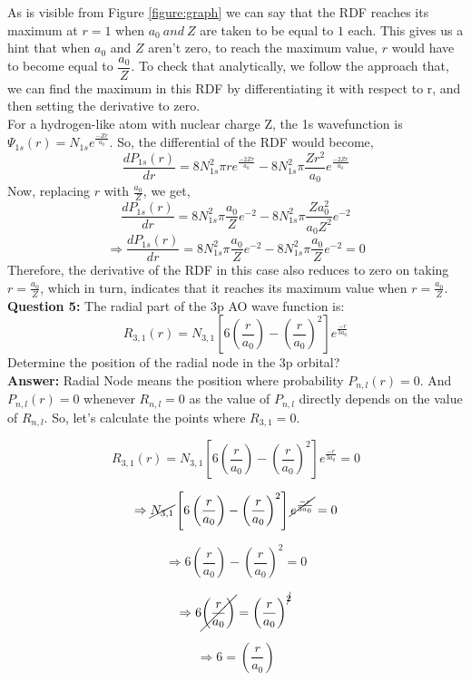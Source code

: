 \documentclass[11pt]{article}
\begin{document}
As is visible from Figure \ref{figure:graph} we can say that the RDF reaches its maximum at $r=1$ when $a_{0}\ and\ Z$ are taken to be equal to $1$ each. This gives us a hint that when $a_{0}$ and $Z$ aren't zero, to reach the maximum value, $r$ would have to become equal to $\dfrac{a_{0}}{Z}$. To check that analytically, we follow the approach that, we can find the maximum in this RDF by differentiating it with respect to r, and then setting
the derivative to zero.\\
For a hydrogen-like atom with nuclear charge Z, the 1s wavefunction is $\Psi_{1s}(r)=N_{1s}e^{\frac{-Zr}{a_{0}}}$. So, the differential of the RDF would become,
$$\frac{dP_{1s}(r)}{dr}=8N_{1s}^{2}\pi r e^{\frac{-2Zr}{a_{0}}}-8N_{1s}^{2}\pi \frac{Zr^{2}}{a_{0}} e^{\frac{-2Zr}{a_{0}}}$$
Now, replacing $r$ with $\frac{a_{0}}{Z}$, we get,
$$\frac{dP_{1s}(r)}{dr}=8N_{1s}^{2}\pi \frac{a_{0}}{Z} e^{-2}-8N_{1s}^{2}\pi \frac{Za_{0}^{2}}{a_{0}Z^{2}} e^{-2}$$
$$\Rightarrow\frac{dP_{1s}(r)}{dr}=8N_{1s}^{2}\pi \frac{a_{0}}{Z} e^{-2}-8N_{1s}^{2}\pi \frac{a_{0}}{Z} e^{-2}=0$$
Therefore, the derivative of the RDF in this case also reduces to zero on taking $r=\frac{a_{0}}{Z}$, which in turn, indicates that it reaches its maximum value when $r=\frac{a_{0}}{Z}$.\\

\textbf{Question 5: }The radial part of the 3p AO wave function is:
$$R_{3,1}(r)=N_{3,1}\left[6\left(\frac{r}{a_{0}}\right)-\left(\frac{r}{a_{0}}\right)^{2}\right]e^{\frac{-r}{3a_{0}}}$$
Determine the position of the radial node in the 3p orbital?\\

\textbf{Answer: }Radial Node means the position where probability $P_{n,l}(r)=0$. And $P_{n,l}(r)=0$ whenever $R_{n,l}=0$ as the value of $P_{n,l}$ directly depends on the value of $R_{n,l}$. So, let's calculate the points where $R_{3,1}=0$.

$$R_{3,1}(r)=N_{3,1}\left[6\left(\frac{r}{a_{0}}\right)-\left(\frac{r}{a_{0}}\right)^{2}\right]e^{\frac{-r}{3a_{0}}}=0$$

$$\Rightarrow\cancel{N_{3,1}}\left[6\left(\frac{r}{a_{0}}\right)-\left(\frac{r}{a_{0}}\right)^{2}\right]\cancel{e^{\frac{-r}{3a_{0}}}}=0$$

$$\Rightarrow6\left(\frac{r}{a_{0}}\right)-\left(\frac{r}{a_{0}}\right)^{2}=0$$

$$\Rightarrow6\cancel{\left(\frac{r}{a_{0}}\right)}=\left(\frac{r}{a_{0}}\right)^{\cancel{2}}$$

$$\Rightarrow6=\left(\frac{r}{a_{0}}\right)$$
\end{document}

